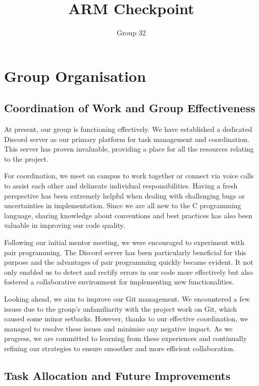 \documentclass[11pt]{article}
\begin{document}
\title{ARM Checkpoint}
\author{Group 32}

\maketitle

\section{Group Organisation}

\subsection{Coordination of Work and Group Effectiveness}


At present, our group is functioning effectively. We have established a dedicated Discord server as our primary platform for task management and coordination. This server has proven invaluable, providing a place for all the resources relating to the project.

For coordination, we meet on campus to work together or connect via voice calls to assist each other and delineate individual responsibilities. Having a fresh perspective has been extremely helpful when dealing with challenging bugs or uncertainties in implementation. Since we are all new to the C programming language, sharing knowledge about conventions and best practices has also been valuable in improving our code quality.

Following our initial mentor meeting, we were encouraged to experiment with pair programming. The Discord server has been particularly beneficial for this purpose and the advantages of pair programming quickly became evident. It not only enabled us to detect and rectify errors in our code more effectively but also fostered a collaborative environment for implementing new functionalities.

Looking ahead, we aim to improve our Git management. We encountered a few issues due to the group’s unfamiliarity with the project work on Git, which caused some minor setbacks. However, thanks to our effective coordination, we managed to resolve these issues and minimise any negative impact. As we progress, we are committed to learning from these experiences and continually refining our strategies to ensure smoother and more efficient collaboration.


\subsection{Task Allocation and Future Improvements}
\end{document}
